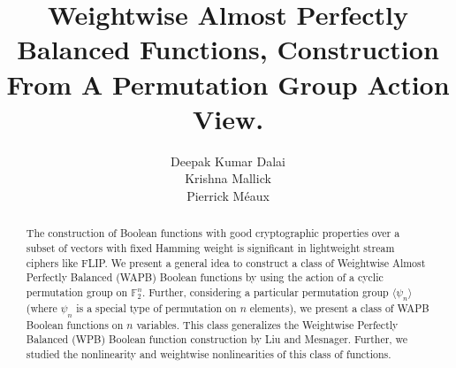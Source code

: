 \documentclass{llncs}
\begin{document}
\title{Weightwise Almost Perfectly Balanced Functions, Construction From A Permutation Group Action View.}
		

\ifnum{}
\author{
Deepak Kumar Dalai\\
Krishna Mallick\\
Pierrick M\'eaux
}

\fi
\maketitle


\setcounter{page}{1}	
\begin{abstract}
The construction of Boolean functions with good cryptographic properties over a subset of vectors with fixed Hamming weight is significant in lightweight stream ciphers like FLIP. 
We present a general idea to construct a class of Weightwise Almost Perfectly Balanced (WAPB) Boolean functions by using the action of a cyclic permutation group on $\mathbb{F}_2^n$. Further, considering a particular permutation group $\langle \psi_n \rangle$ (where $\psi_n$ is a special type of permutation on $n$ elements), we present a class of WAPB Boolean functions on $n$ variables. This class generalizes the Weightwise Perfectly Balanced (WPB) Boolean function construction by Liu and Mesnager. Further, we studied the nonlinearity and weightwise nonlinearities of this class of functions.
\end{abstract}
 
\end{document}
